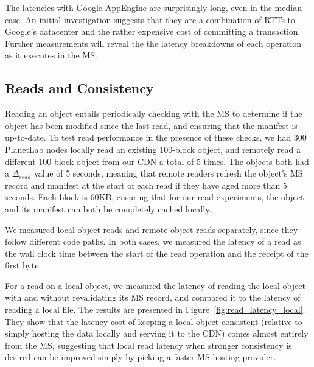 The latencies with Google AppEngine are surprisingly long, even in the median case.  An initial investigation suggests that they are a combination of RTTs to Google's datacenter and the rather expensive cost of committing a transaction.  Further measurements will reveal the the latency breakdowns of each operation as it executes in the MS.

\subsection{Reads and Consistency}




Reading an object entails periodically checking with the MS to determine if the object has been modified since the last read, and ensuring that the manifest is up-to-date.  To test read performance in the presence of these checks, we had 300 PlanetLab nodes locally read an existing 100-block object, and remotely read a different 100-block object from our CDN a total of 5 times.  The objects both had a $\Delta_{read}$ value of 5 seconds, meaning that remote readers refresh the object's MS record and manifest at the start of each read if they have aged more than 5 seconds.  Each block is 60KB, ensuring that for our read experiments, the object and its manifest can both be completely cached locally.

We measured local object reads and remote object reads separately, since they follow different code paths.  In both cases, we measured the latency of a read as the wall clock time between the start of the read operation and the receipt of the first byte.

For a read on a local object, we measured the latency of reading the local object with and without revalidating its MS record, and compared it to the latency of reading a local file.  The results are presented in Figure~\ref{fig:read_latency_local}.  They show that the latency cost of keeping a local object consistent (relative to simply hosting the data locally and serving it to the CDN) comes almost entirely from the MS, suggesting that local read latency when stronger consistency is desired can be improved simply by picking a faster MS hosting provider.

